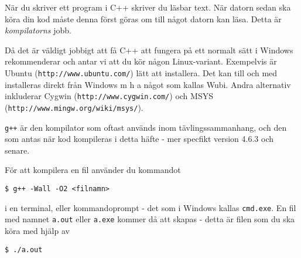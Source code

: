 När du skriver ett program i C++ skriver du läsbar text. När datorn sedan ska köra din kod måste denna först göras om till något datorn kan läsa. Detta är \emph{kompilatorns} jobb.

Då det är väldigt jobbigt att få C++ att fungera på ett normalt sätt i Windows rekommenderar och antar vi att du kör någon Linux-variant. Exempelvis är Ubuntu (\texttt{http://www.ubuntu.com/}) lätt att installera. Det kan till och med installeras direkt från Windows m h a något som kallas Wubi. Andra alternativ inkluderar Cygwin (\texttt{http://www.cygwin.com/}) och MSYS (\texttt{http://www.mingw.org/wiki/msys/}). 

\texttt{g++} är den kompilator som oftast används inom tävlingssammanhang, och den som antas när kod kompileras i detta häfte - mer specfikt version 4.6.3 och senare.

För att kompilera en fil använder du kommandot

\texttt{\$ g++ -Wall -O2 <filnamn>}

i en terminal, eller kommandoprompt - det som i Windows kallas \texttt{cmd.exe}. En fil med namnet \texttt{a.out} eller \texttt{a.exe} kommer då att skapas - detta är filen som du ska köra med hjälp av

\texttt{\$ ./a.out}
